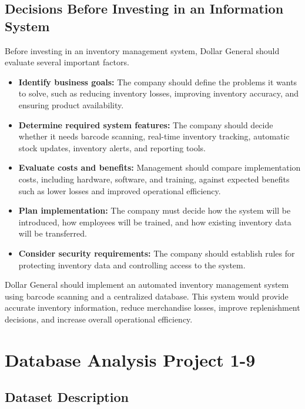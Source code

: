 \documentclass[12pt]{article}
\begin{document}
\subsection{Decisions Before Investing in an Information System}

Before investing in an inventory management system, Dollar General should
evaluate several important factors.

\begin{itemize}

\item \textbf{Identify business goals:}
The company should define the problems it wants to solve, such as reducing
inventory losses, improving inventory accuracy, and ensuring product availability.

\item \textbf{Determine required system features:}
The company should decide whether it needs barcode scanning, real-time inventory
tracking, automatic stock updates, inventory alerts, and reporting tools.

\item \textbf{Evaluate costs and benefits:}
Management should compare implementation costs, including hardware, software,
and training, against expected benefits such as lower losses and improved
operational efficiency.

\item \textbf{Plan implementation:}
The company must decide how the system will be introduced, how employees will be
trained, and how existing inventory data will be transferred.

\item \textbf{Consider security requirements:}
The company should establish rules for protecting inventory data and controlling
access to the system.

\end{itemize}

Dollar General should implement an automated inventory management system using
barcode scanning and a centralized database. This system would provide accurate
inventory information, reduce merchandise losses, improve replenishment decisions,
and increase overall operational efficiency.


\section{Database Analysis Project 1-9}

\subsection{Dataset Description}
\end{document}
